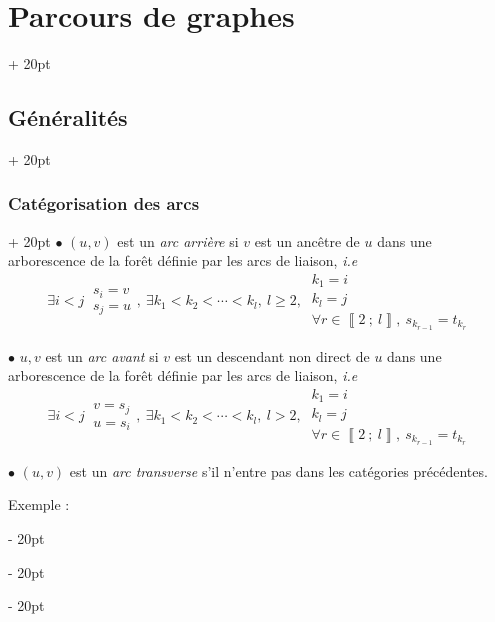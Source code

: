 \documentclass[a4paper, 12pt, twoside]{article}
\newcommand{\nset}[2]{\left\llbracket #1\ ;\ #2 \right\rrbracket}
\renewcommand{\ge}{\geqslant}
\newcommand{\ind}[1][20pt]{\advance\leftskip + #1}
\newcommand{\deind}[1][20pt]{\advance\leftskip - #1}
\newenvironment{indt}[2][20pt]{#2 \par \ind[#1]}{\par \deind} %
\begin{document}
\begin{indt}{\section{Parcours de graphes}}
\begin{indt}{\subsection{Généralités}}
\begin{indt}{\subsubsection{Catégorisation des arcs}}
                $\bullet$ $(u, v)$ est un \textit{arc arrière} si $v$ est un ancêtre de $u$ dans une arborescence de la forêt définie par les arcs de liaison, \textit{i.e}
                \[
                    \exists i < j\
                    \begin{array}{|l}
                        s_i = v
                        \\
                        s_j = u
                    \end{array}
                    ,\
                    \exists k_1 < k_2 < \cdots < k_l,\ l \ge 2,\
                    \begin{array}{|l}
                        k_1 = i
                        \\
                        k_l = j
                        \\
                        \forall r \in \nset 2 l,\ s_{k_{r - 1}} = t_{k_r}
                    \end{array}
                \]

                $\bullet$ $u, v$ est un \textit{arc avant} si $v$ est un descendant non direct de $u$ dans une arborescence de la forêt définie par les arcs de liaison, \textit{i.e}
                \[
                    \exists i < j\
                    \begin{array}{|l}
                        v = s_j
                        \\
                        u = s_i
                    \end{array}
                    ,\
                    \exists k_1 < k_2 < \cdots < k_l,\ l > 2,\
                    \begin{array}{|l}
                        k_1 = i
                        \\
                        k_l = j
                        \\
                        \forall r \in \nset 2 l,\ s_{k_{r - 1}} = t_{k_r}
                    \end{array}
                \]

                $\bullet$ $(u, v)$ est un \textit{arc transverse} s'il n'entre pas dans les catégories précédentes.

                \vspace{12pt}
                
                Exemple :

                \begin{center}
\end{center}
\end{indt}
\end{indt}
\end{indt}
\end{document}
